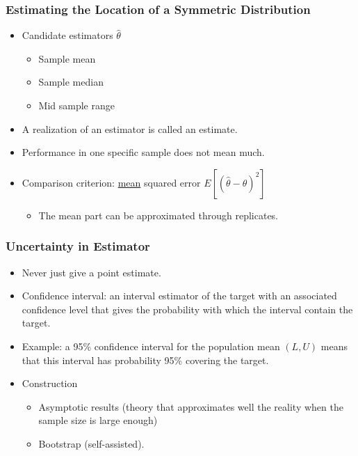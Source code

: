 \documentclass[leqno]{beamer}
\begin{document}
\begin{frame}
  \frametitle{Estimating the Location of a Symmetric Distribution}
  \begin{itemize}
  \item
    Candidate estimators $\hat\theta$
    \begin{itemize}
    \item Sample mean
    \item Sample median
    \item Mid sample range
    \end{itemize}
  \item
    A realization of an estimator is called an estimate.
  \item
    Performance in one specific sample does not mean much.
  \item
    Comparison criterion: \underline{mean} squared error
    $E[(\hat\theta - \theta)^2]$
    \begin{itemize}
    \item The mean part can be approximated through replicates.
    \end{itemize}
  \end{itemize}
\end{frame}


\begin{frame}
  \frametitle{Uncertainty in Estimator}
  \begin{itemize}
  \item 
    Never just give a point estimate.
  \item
    Confidence interval: an interval estimator of the target with an
    associated confidence level that gives the probability with which
    the interval contain the target.
  \item
    Example: a 95\% confidence interval for the population mean
    $(L, U)$ means that this interval has probability 95\% covering
    the target.
  \item
    Construction
    \begin{itemize}
    \item Asymptotic results (theory that approximates well the
      reality when the sample size is large enough)
    \item Bootstrap (self-assisted).
    \end{itemize}
  \end{itemize}
\end{frame}
\end{document}
